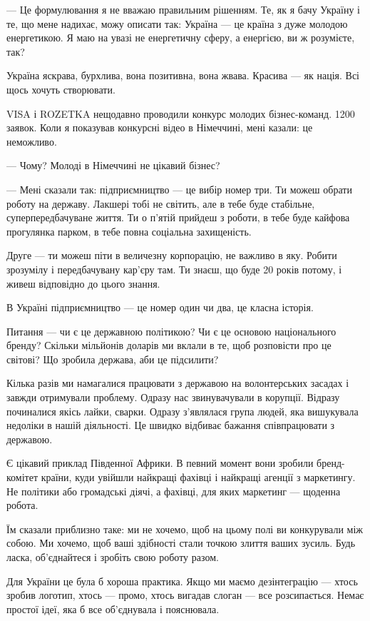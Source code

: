--- Це формулювання я не вважаю правильним рішенням. Те, як я бачу Україну і те,
що мене надихає, можу описати так: Україна --- це країна з дуже молодою
енергетикою. Я маю на увазі не енергетичну сферу, а енергією, ви ж розумієте,
так? 

Україна яскрава, бурхлива, вона позитивна, вона жвава. Красива --- як нація. Всі
щось хочуть створювати. 

VISA і ROZETKA нещодавно проводили конкурс молодих бізнес-команд. 1200 заявок.
Коли я показував конкурсні відео в Німеччині, мені казали: це неможливо.

--- Чому? Молоді в Німеччині не цікавий бізнес?

--- Мені сказали так: підприємництво --- це вибір номер три. Ти можеш обрати роботу
на державу. Лакшері тобі не світить, але в тебе буде стабільне,
суперпередбачуване життя. Ти о п’ятій прийдеш з роботи, в тебе буде кайфова
прогулянка парком, в тебе повна соціальна захищеність.

Друге --- ти можеш піти в величезну корпорацію, не важливо в яку. Робити
зрозумілу і передбачувану кар’єру там. Ти знаєш, що буде 20 років потому, і
живеш відповідно до цього знання.

В Україні підприємництво --- це номер один чи два, це класна історія.

Питання --- чи є це державною політикою? Чи є це основою національного бренду?
Скільки мільйонів доларів ми вклали в те, щоб розповісти про це світові? Що
зробила держава, аби це підсилити?

Кілька разів ми намагалися працювати з державою на волонтерських засадах і
завжди отримували проблему. Одразу нас звинувачували в корупції. Відразу
починалися якісь лайки, сварки. Одразу з’являлася група людей, яка вишукувала
недоліки в нашій діяльності. Це швидко відбиває бажання співпрацювати з
державою.

Є цікавий приклад Південної Африки. В певний момент вони зробили бренд-комітет
країни, куди увійшли найкращі фахівці і найкращі агенції з маркетингу. Не
політики або громадські діячі, а фахівці, для яких маркетинг --- щоденна робота. 

Їм сказали приблизно таке: ми не хочемо, щоб на цьому полі ви конкурували між
собою. Ми хочемо, щоб ваші здібності стали точкою злиття ваших зусиль. Будь
ласка, об’єднайтеся і зробіть свою роботу разом.

Для України це була б хороша практика. Якщо ми маємо дезінтеграцію --- хтось
зробив логотип, хтось --- промо, хтось вигадав слоган --- все розсипається. Немає
простої ідеї, яка б все об’єднувала і пояснювала.

